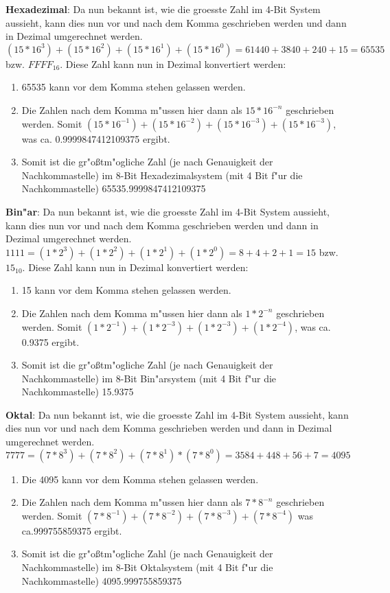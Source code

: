 \documentclass[a4paper,11pt,titlepage]{article}
\begin{document}
    \noindent \textbf{Hexadezimal}:
    Da nun bekannt ist, wie die groesste Zahl im 4-Bit System aussieht, kann dies nun vor und nach dem Komma geschrieben werden und dann in Dezimal umgerechnet werden.
    $(15 * 16^3) + (15 * 16^2) + (15 * 16^1) + (15 * 16^0) = 61440 + 3840 + 240 + 15 = 65535$ bzw. $FFFF_{16}$. Diese Zahl kann nun in Dezimal konvertiert werden:
    \begin{enumerate}
        \item 65535 kann vor dem Komma stehen gelassen werden.
        \item Die Zahlen nach dem Komma m"ussen hier dann als $15 * 16^{-n}$ geschrieben werden. Somit $(15 * 16^{-1}) + (15 * 16^{-2}) + (15 * 16^{-3}) + (15 * 16^{-3})$, was ca. 0.9999847412109375 ergibt.
        \item Somit ist die gr"oßtm"ogliche Zahl (je nach Genauigkeit der Nachkommastelle) im 8-Bit Hexadezimalsystem (mit 4 Bit f"ur die Nachkommastelle) 65535.9999847412109375
    \end{enumerate}

    \noindent \textbf{Bin"ar}:
    Da nun bekannt ist, wie die groesste Zahl im 4-Bit System aussieht, kann dies nun vor und nach dem Komma geschrieben werden und dann in Dezimal umgerechnet werden.
    $1111 = (1 * 2^3) + (1 * 2^2) + (1 * 2^1) + (1 * 2^0) = 8 + 4 + 2 + 1 = 15$ bzw. $15_{10}$. Diese Zahl kann nun in Dezimal konvertiert werden:
    \begin{enumerate}
        \item 15 kann vor dem Komma stehen gelassen werden.
        \item Die Zahlen nach dem Komma m"ussen hier dann als $1 * 2^{-n}$ geschrieben werden. Somit $(1 * 2^{-1}) + (1 * 2^{-3}) + (1 * 2^{-3}) + (1 * 2^{-4})$, was ca. 0.9375 ergibt.
        \item Somit ist die gr"oßtm"ogliche Zahl (je nach Genauigkeit der Nachkommastelle) im 8-Bit Bin"arsystem (mit 4 Bit f"ur die Nachkommastelle) 15.9375
    \end{enumerate}

    \noindent \textbf{Oktal}:
    Da nun bekannt ist, wie die groesste Zahl im 4-Bit System aussieht, kann dies nun vor und nach dem Komma geschrieben werden und dann in Dezimal umgerechnet werden.
    $7777 = (7 * 8^3) + (7 * 8^2) + (7* 8^1) * (7* 8^0) = 3584 + 448 + 56 + 7 = 4095$

    \begin{enumerate}
        \item Die 4095 kann vor dem Komma stehen gelassen werden.
        \item Die Zahlen nach dem Komma m"ussen hier dann als $7 * 8^{-n}$ geschrieben werden. Somit $(7 * 8^{-1}) + (7 * 8^{-2}) + (7 * 8^{-3}) + (7 * 8^{-4})$ was ca.999755859375 ergibt.
        \item Somit ist die gr"oßtm"ogliche Zahl (je nach Genauigkeit der Nachkommastelle) im 8-Bit Oktalsystem (mit 4 Bit f"ur die Nachkommastelle) 4095.999755859375
    \end{enumerate}
\end{document}
